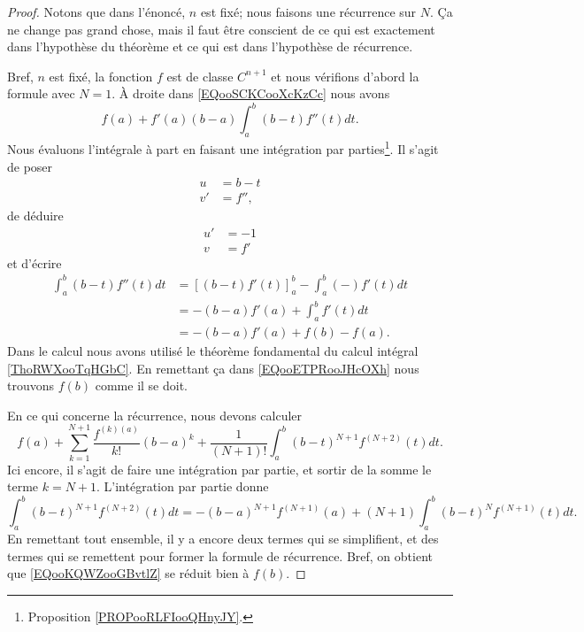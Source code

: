 \begin{proof}
	Notons que dans l'énoncé, \( n\) est fixé; nous faisons une récurrence sur \( N\). Ça ne change pas grand chose, mais il faut être conscient de ce qui est exactement dans l'hypothèse du théorème et ce qui est dans l'hypothèse de récurrence.

	Bref, \( n\) est fixé, la fonction \( f\) est de classe \( C^{n+1}\) et nous vérifions d'abord la formule avec \( N=1\). À droite dans \eqref{EQooSCKCooXcKzCc} nous avons
	\begin{equation}        \label{EQooETPRooJHcOXh}
		f(a)+f'(a)(b-a)\int_a^b(b-t)f''(t)dt.
	\end{equation}
	Nous évaluons l'intégrale à part en faisant une intégration par parties\footnote{Proposition \ref{PROPooRLFIooQHnyJY}.}. Il s'agit de poser
	\begin{subequations}
		\begin{align}
			u  & =b-t  \\
			v' & =f'',
		\end{align}
	\end{subequations}
	de déduire
	\begin{subequations}
		\begin{align}
			u' & =-1 \\
			v  & =f'
		\end{align}
	\end{subequations}
	et d'écrire
	\begin{subequations}
		\begin{align}
			\int_a^b(b-t)f''(t)dt & =\left[ (b-t)f'(t) \right]^b_a-\int_a^b(-)f'(t)dt \\
			                      & =-(b-a)f'(a)+\int_a^bf'(t)dt                      \\
			                      & =-(b-a)f'(a)+f(b)-f(a).
		\end{align}
	\end{subequations}
	Dans le calcul nous avons utilisé le théorème fondamental du calcul intégral \ref{ThoRWXooTqHGbC}. En remettant ça dans \eqref{EQooETPRooJHcOXh} nous trouvons \( f(b)\) comme il se doit.

	En ce qui concerne la récurrence, nous devons calculer
	\begin{equation}        \label{EQooKQWZooGBvtlZ}
		f(a)+\sum_{k=1}^{N+1}\frac{ f^{(k)(a)} }{ k! }(b-a)^k+\frac{1}{ (N+1)! }\int_a^b(b-t)^{N+1}f^{(N+2)}(t)dt.
	\end{equation}
	Ici encore, il s'agit de faire une intégration par partie, et sortir de la somme le terme \( k=N+1\). L'intégration par partie donne
	\begin{equation}
		\int_a^b(b-t)^{N+1}f^{(N+2)}(t)dt=-(b-a)^{N+1}f^{(N+1)}(a)+(N+1)\int_a^b(b-t)^Nf^{(N+1)}(t)dt.
	\end{equation}
	En remettant tout ensemble, il y a encore deux termes qui se simplifient, et des termes qui se remettent pour former la formule de récurrence. Bref, on obtient que \eqref{EQooKQWZooGBvtlZ} se réduit bien à \( f(b)\).
\end{proof}

